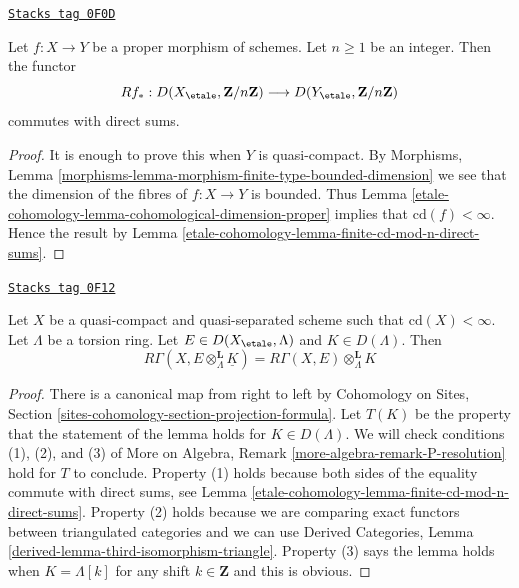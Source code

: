 \begin{lemma}
\label{etale-cohomology-lemma-proper-mod-n-direct-sums}
\href{https://stacks.math.columbia.edu/tag/0F0D}{\texttt{Stacks tag 0F0D}}

Let $f : X \to Y$ be a proper morphism of schemes. Let $n \geq 1$
be an integer. Then the functor
$$
Rf_* :
D(X_\etale, \mathbf{Z}/n\mathbf{Z})
\longrightarrow
D(Y_\etale, \mathbf{Z}/n\mathbf{Z})
$$
commutes with direct sums.
\end{lemma}

\begin{proof}
It is enough to prove this when $Y$ is quasi-compact. By
Morphisms, Lemma \ref{morphisms-lemma-morphism-finite-type-bounded-dimension}
we see that the dimension of the fibres of
$f : X \to Y$ is bounded.
Thus Lemma \ref{etale-cohomology-lemma-cohomological-dimension-proper}
implies that $\text{cd}(f) < \infty$. Hence the
result by Lemma \ref{etale-cohomology-lemma-finite-cd-mod-n-direct-sums}.
\end{proof}

\begin{lemma}
\label{etale-cohomology-lemma-pull-out-constant-mod-n}
\href{https://stacks.math.columbia.edu/tag/0F12}{\texttt{Stacks tag 0F12}}

Let $X$ be a quasi-compact and quasi-separated scheme
such that $\text{cd}(X) < \infty$. Let $\Lambda$ be a torsion ring.
Let $E \in D(X_\etale, \Lambda)$ and $K \in D(\Lambda)$. Then
$$
R\Gamma(X, E \otimes_\Lambda^\mathbf{L} \underline{K}) =
R\Gamma(X, E) \otimes_\Lambda^\mathbf{L} K
$$
\end{lemma}

\begin{proof}
There is a canonical map from right to left by
Cohomology on Sites, Section \ref{sites-cohomology-section-projection-formula}.
Let $T(K)$ be the property that the statement of the
lemma holds for $K \in D(\Lambda)$.
We will check conditions (1), (2), and (3) of
More on Algebra, Remark \ref{more-algebra-remark-P-resolution}
hold for $T$ to conclude.
Property (1) holds because both sides of the equality
commute with direct sums, see
Lemma \ref{etale-cohomology-lemma-finite-cd-mod-n-direct-sums}.
Property (2) holds because we are comparing exact functors
between triangulated categories and we can use
Derived Categories, Lemma \ref{derived-lemma-third-isomorphism-triangle}.
Property (3) says the lemma holds when $K = \Lambda[k]$
for any shift $k \in \mathbf{Z}$ and this is obvious.
\end{proof}

